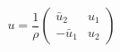 \begin{equation}
u= \frac{1}{\rho} \left(
\begin{array}{cc}
\bar{u}_{2} & u_{1} \\
-\bar{u}_{1} & u_{2}
\end{array}
\right)
\end{equation}

